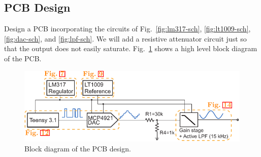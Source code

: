 \documentclass[letterpaper, 11pt]{article}
\begin{document}
	

\subsection{PCB Design}

Design a PCB incorporating the circuits of Fig.~\ref{fig:lm317-sch}, \ref{fig:lt1009-sch}, \ref{fig:dac-sch}, and \ref{fig:lpf-sch}. We will add a resistive attenuator circuit just so that the output does not easily saturate. Fig.~\ref{fig:pcb-block} shows a high level block diagram of the PCB.

\begin{figure}[ht]
	\includegraphics[width=5.3in]{pcb-block}
	\caption{Block diagram of the PCB design.}
	\label{fig:pcb-block}
\end{figure}
\end{document}
